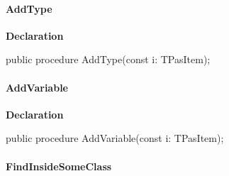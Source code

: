 \documentclass{report}
\newif\ifpdf
\begin{document}
\paragraph*{AddType}\hspace*{\fill}

\label{PasDoc_Items.TPasUnit-AddType}
\begin{list}{}{
\setlength{\itemindent}{0cm}
\setlength{\listparindent}{0cm}
\setlength{\leftmargin}{\evensidemargin}
\addtolength{\leftmargin}{\tmplength}
\settowidth{\labelsep}{X}
\addtolength{\leftmargin}{\labelsep}
\setlength{\labelwidth}{\tmplength}
}
\item[\textbf{Declaration}\hfill]
\ifpdf
\begin{flushleft}
\fi
\begin{ttfamily}
public procedure AddType(const i: TPasItem);\end{ttfamily}

\ifpdf
\end{flushleft}
\fi

\end{list}
\paragraph*{AddVariable}\hspace*{\fill}

\label{PasDoc_Items.TPasUnit-AddVariable}
\begin{list}{}{
\setlength{\itemindent}{0cm}
\setlength{\listparindent}{0cm}
\setlength{\leftmargin}{\evensidemargin}
\addtolength{\leftmargin}{\tmplength}
\settowidth{\labelsep}{X}
\addtolength{\leftmargin}{\labelsep}
\setlength{\labelwidth}{\tmplength}
}
\item[\textbf{Declaration}\hfill]
\ifpdf
\begin{flushleft}
\fi
\begin{ttfamily}
public procedure AddVariable(const i: TPasItem);\end{ttfamily}

\ifpdf
\end{flushleft}
\fi

\end{list}
\paragraph*{FindInsideSomeClass}\hspace*{\fill}
\end{document}
